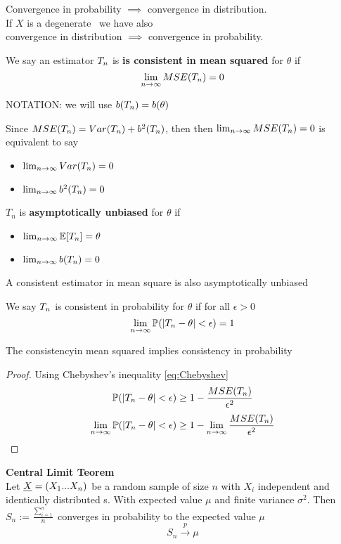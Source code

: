 \begin{prop}
	Convergence in probability $\implies$ convergence in distribution.\\
	If $X$ is a degenerate \rv \ we have also\\  convergence in distribution $\implies$ convergence in probability.
\end{prop}
\begin{defi}
	We say an estimator $T_{n}$ is \textbf{is consistent in mean squared} for $\theta$ if 
	$$\lim_{n\to \infty}MSE(T_{n})=0$$
\end{defi}
NOTATION: we will use $b(T_{n})=b(\theta)$
\begin{oss}
	Since $MSE(T_{n})=Var(T_n)+b^2(T_{n})$, then then $\lim_{n\to \infty}MSE(T_{n})=0$ is equivalent to say
	\begin{itemize}
		\item  $\lim_{n\to \infty}Var(T_{n})=0$
		\item $\lim_{n\to \infty}b^2(T_{n})=0$
	\end{itemize}
\end{oss}
\begin{defi}
	$T_n$ is \textbf{asymptotically unbiased} for $\theta$ if
	\begin{itemize}
		\item $\lim_{n\to \infty}\mathbb{E}[T_{n}]=\theta$
		\item $\lim_{n\to \infty}b(T_{n})=0$
	\end{itemize}
\end{defi}
\begin{prop}
	A consistent estimator in mean square is also asymptotically unbiased
\end{prop}

\begin{defi}
	We say $T_{n}$ is consistent in probability for $\theta$ if for all $\epsilon >0$
	$$\lim_{n\to \infty}\mathbb{P}(|T_{n}-\theta|<\epsilon)=1$$
\end{defi}
\begin{prop}
	The  consistencyin mean squared implies consistency in probability 
\end{prop}
\begin{proof}
	Using Chebyshev's inequality \ref{eq:Chebyshev}
	$$\mathbb{P}(|T_{n}-\theta|<\epsilon)\geq 1-\frac{MSE(T_{n})}{\epsilon^2}$$
	$$\lim_{n\to \infty}\mathbb{P}(|T_{n}-\theta|<\epsilon)\geq 1-\lim_{n\to \infty}\frac{MSE(T_{n})}{\epsilon^2}$$
\end{proof}
\begin{teo}
	\textbf{Central Limit Teorem}\\
	Let $\underline X=(X_1... X_n)$ be a random sample of size $n$ with $X_i$ independent and identically distributed \rv s. With  expected value $\mu$ and finite variance $\sigma^2$. Then $S_n:=\frac{\sum_{i=1}^n}{n}$ converges in probability to the expected value $\mu$
	$$S_n\xrightarrow{p} \mu$$
\end{teo}


